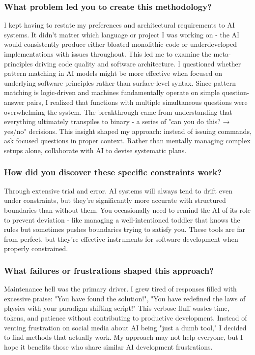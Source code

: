 \documentclass{article}
\begin{document}
\subsubsection{What problem led you to create this methodology?}
I kept having to restate my preferences and architectural requirements to AI systems. It didn't matter which language or project I was working on - the AI would consistently produce either bloated monolithic code or underdeveloped implementations with issues throughout. This led me to examine the meta-principles driving code quality and software architecture. I questioned whether pattern matching in AI models might be more effective when focused on underlying software principles rather than surface-level syntax. Since pattern matching is logic-driven and machines fundamentally operate on simple question-answer pairs, I realized that functions with multiple simultaneous questions were overwhelming the system. The breakthrough came from understanding that everything ultimately transpiles to binary - a series of "can you do this? → yes/no" decisions. This insight shaped my approach: instead of issuing commands, ask focused questions in proper context. Rather than mentally managing complex setups alone, collaborate with AI to devise systematic plans.

\subsubsection{How did you discover these specific constraints work?}
Through extensive trial and error. AI systems will always tend to drift even under constraints, but they're significantly more accurate with structured boundaries than without them. You occasionally need to remind the AI of its role to prevent deviation - like managing a well-intentioned toddler that knows the rules but sometimes pushes boundaries trying to satisfy you. These tools are far from perfect, but they're effective instruments for software development when properly constrained.

\subsubsection{What failures or frustrations shaped this approach?}
Maintenance hell was the primary driver. I grew tired of responses filled with excessive praise: "You have found the solution!", "You have redefined the laws of physics with your paradigm-shifting script!" This verbose fluff wastes time, tokens, and patience without contributing to productive development. Instead of venting frustration on social media about AI being "just a dumb tool," I decided to find methods that actually work. My approach may not help everyone, but I hope it benefits those who share similar AI development frustrations.
\end{document}
